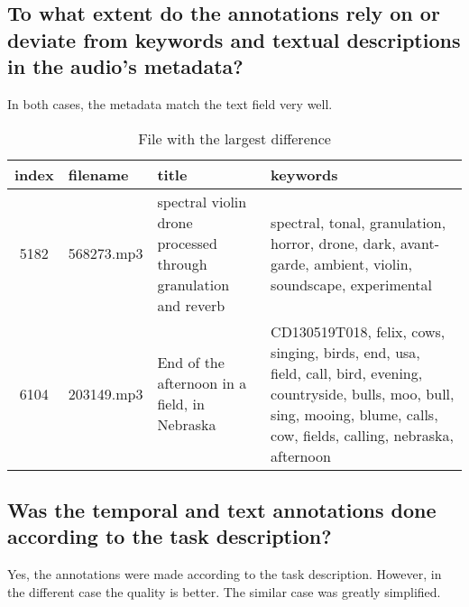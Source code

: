 \subsection{To what extent do the annotations rely on or deviate from keywords and textual descriptions in the audio’s metadata?}
\label{sec:Case Study:b}

In both cases, the metadata match the text field very well.

\begin{table}[h]
  \caption{File with the largest difference}
  \label{tab:metadata match}
  \centering
  \begin{tabular}{clp{4cm}p{8cm}}
    \toprule
    index & filename & title & keywords \\
    \midrule
    5182 & 568273.mp3 & spectral violin drone processed through granulation and reverb & spectral, tonal, granulation, horror, drone, dark, avant-garde, ambient, violin, soundscape, experimental \\
    6104 & 203149.mp3 & End of the afternoon in a field, in Nebraska & CD130519T018, felix, cows, singing, birds, end, usa, field, call, bird, evening, countryside, bulls, moo, bull, sing, mooing, blume, calls, cow, fields, calling, nebraska, afternoon \\
    \bottomrule
  \end{tabular}
\end{table}

\subsection{Was the temporal and text annotations done according to the task description?}
\label{sec:Case Study:c}

Yes, the annotations were made according to the task description. 
However, in the different case the quality is better. 
The similar case was greatly simplified.


